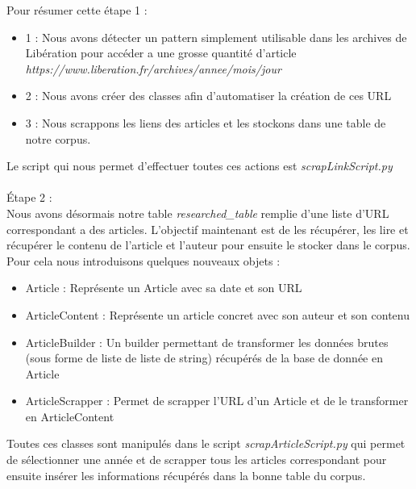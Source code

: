 \documentclass[french,12pt]{article}
\begin{document}
Pour résumer cette étape 1 :\\
\begin{itemize}
    \item 1 : Nous avons détecter un pattern simplement utilisable dans les archives de Libération pour accéder a une grosse quantité d'article \textit{https://www.liberation.fr/archives/annee/mois/jour}\\
    \item 2 : Nous avons créer des classes afin d'automatiser la création de ces URL\\
    \item 3 : Nous scrappons les liens des articles et les stockons dans une table de notre corpus.\\
\end{itemize}

Le script qui nous permet d'effectuer toutes ces actions est \textit{scrapLinkScript.py}\\\\


Étape 2 : \\

Nous avons désormais notre table \textit{researched\_table} remplie d'une liste d'URL correspondant a des articles. L'objectif maintenant est de les récupérer, les lire et récupérer le contenu de l'article et l'auteur pour ensuite le stocker dans le corpus.\\

Pour cela nous introduisons quelques nouveaux objets : \\

\begin{itemize}
    \item Article : Représente un Article avec sa date et son URL\\
    \item ArticleContent : Représente un article concret avec son auteur et son contenu\\
    \item ArticleBuilder : Un builder permettant de transformer les données brutes (sous forme de liste de liste de string) récupérés de la base de donnée en Article\\
    \item ArticleScrapper : Permet de scrapper l'URL d'un Article et de le transformer en ArticleContent\\
\end{itemize}

Toutes ces classes sont manipulés dans le script \textit{scrapArticleScript.py} qui permet de sélectionner une année et de scrapper tous les articles correspondant pour ensuite insérer les informations récupérés dans la bonne table du corpus.\\
\end{document}
